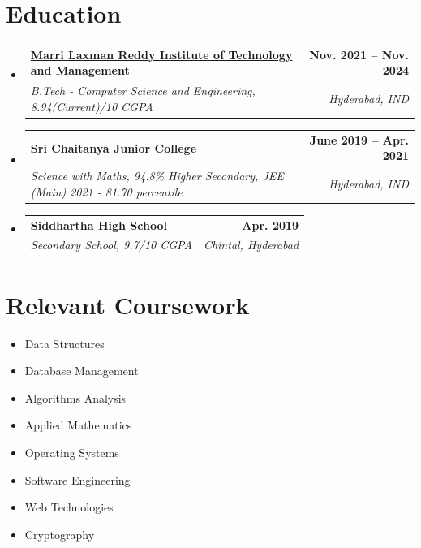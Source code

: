 \documentclass[a4paper,11pt]{article}
\makeatletter
\newcommand{\resumeItem}[1]{\item\small{{#1 \vspace{-2pt}}}}
\newcommand{\resumeSubheading}[4]{
  \vspace{-2pt}\item
    \begin{tabular*}{0.97\textwidth}[t]{l@{\extracolsep{\fill}}r}
      \textbf{#1} & \textbf{\small #2} \\
      \textit{\small#3} & \textit{\small #4} \\
    \end{tabular*}\vspace{-7pt}
}
\newcommand{\resumeSubSubheading}[2]{
  \item
    \begin{tabular*}{0.97\textwidth}{l@{\extracolsep{\fill}}r}
      \textit{\small#1} & \textit{\small #2} \\
    \end{tabular*}\vspace{-7pt}
}
\newcommand{\resumeSubHeadingListStart}{\begin{itemize}[leftmargin=0.15in, label={}]}
\newcommand{\resumeSubHeadingListEnd}{\end{itemize}}
\newcommand{\resumeItemListStart}{\begin{itemize}}
\newcommand{\resumeItemListEnd}{\end{itemize}\vspace{-5pt}}
\makeatother
\begin{document}
\vspace{-15pt}
\section{Education}
  \resumeSubHeadingListStart
    \resumeSubheading
      {\href{https://mlritm.ac.in}{Marri Laxman Reddy Institute of Technology and Management}}{Nov. 2021 -- Nov. 2024}
      {B.Tech - Computer Science and Engineering, 8.94(Current)/10 CGPA}{Hyderabad, IND}
    \resumeSubheading
      {Sri Chaitanya Junior College}{June 2019 -- Apr. 2021}
      {Science with Maths, 94.8\% Higher Secondary, JEE (Main) 2021 - 81.70 percentile}{Hyderabad, IND}
    \resumeSubheading
      {Siddhartha High School}{Apr. 2019}
      {Secondary School, 9.7/10 CGPA}{Chintal, Hyderabad}
  \resumeSubHeadingListEnd

\section{Relevant Coursework}
        \begin{multicols}{4}
            \begin{itemize}[itemsep=-3pt, parsep=3pt]
              \small
                \item Data Structures
                \item Database Management
                \item Algorithms Analysis
                \item Applied Mathematics
                \item Operating Systems
                \item Software Engineering
                \item Web Technologies
                \item Cryptography
              \end{itemize}
        \end{multicols}
        \vspace*{2.0\multicolsep}

\end{document}
